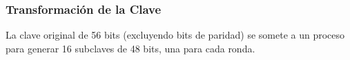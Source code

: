 
\subsubsection{Transformación de la Clave}

La clave original de 56 bits (excluyendo bits de paridad) se somete a un proceso para generar 16 subclaves de 48 bits, una para cada ronda.










